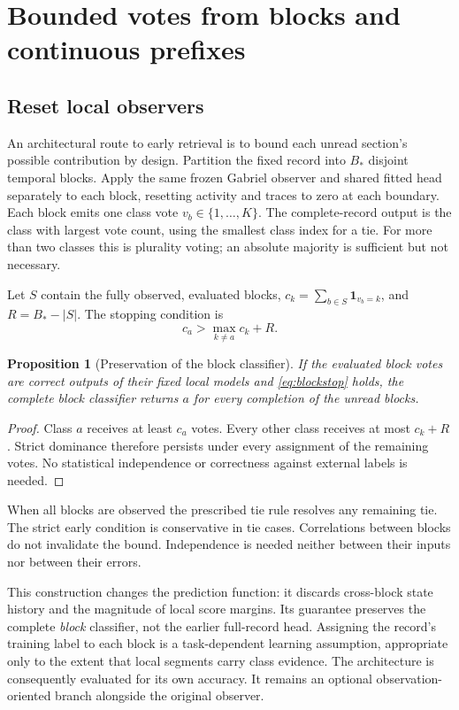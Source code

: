 \documentclass[11pt,a4paper]{article}
\newtheorem{proposition}[theorem]{Proposition}
\theoremstyle{definition}\newtheorem{definition}[theorem]{Definition}
\begin{document}
\section{Bounded votes from blocks and continuous prefixes}\label{sec:blockobserver}
\subsection{Reset local observers}
An architectural route to early retrieval is to bound each unread section's possible contribution by design. Partition the fixed record into $B_*$ disjoint temporal blocks. Apply the same frozen Gabriel observer and shared fitted head separately to each block, resetting activity and traces to zero at each boundary. Each block emits one class vote $v_b\in\{1,\ldots,K\}$. The complete-record output is the class with largest vote count, using the smallest class index for a tie. For more than two classes this is plurality voting; an absolute majority is sufficient but not necessary.

Let $S$ contain the fully observed, evaluated blocks, $c_k=\sum_{b\in S}\mathbf1_{v_b=k}$, and $R=B_*-|S|$. The stopping condition is
\begin{equation}
 c_a>\max_{k\ne a}c_k+R.\label{eq:blockstop}
\end{equation}
\begin{proposition}[Preservation of the block classifier]
If the evaluated block votes are correct outputs of their fixed local models and \eqref{eq:blockstop} holds, the complete block classifier returns $a$ for every completion of the unread blocks.
\end{proposition}
\begin{proof}
Class $a$ receives at least $c_a$ votes. Every other class receives at most $c_k+R$. Strict dominance therefore persists under every assignment of the remaining votes. No statistical independence or correctness against external labels is needed.
\end{proof}
When all blocks are observed the prescribed tie rule resolves any remaining tie. The strict early condition is conservative in tie cases. Correlations between blocks do not invalidate the bound. Independence is needed neither between their inputs nor between their errors.

This construction changes the prediction function: it discards cross-block state history and the magnitude of local score margins. Its guarantee preserves the complete \emph{block} classifier, not the earlier full-record head. Assigning the record's training label to each block is a task-dependent learning assumption, appropriate only to the extent that local segments carry class evidence. The architecture is consequently evaluated for its own accuracy. It remains an optional observation-oriented branch alongside the original observer.
\end{document}
